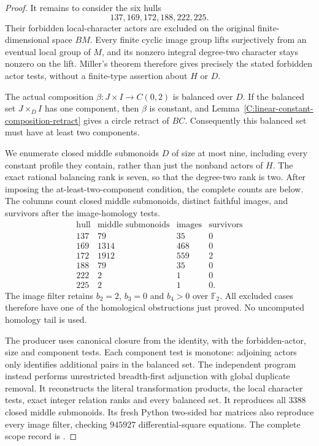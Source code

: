 \begin{proof}
It remains to consider the six hulls
\[
 137,169,172,188,222,225.
\]
Their forbidden local-character actors are excluded on the original
finite-dimensional space $BM$.  Every finite cyclic image group
lifts surjectively from an eventual local group of $M$, and its
nonzero integral degree-two character stays nonzero on the lift.
Miller's theorem therefore gives precisely the stated forbidden
actor tests, without a finite-type assertion about $H$ or $D$.

The actual composition $\beta:J\times I\to C(0,2)$ is balanced
over $D$.  If the balanced set $J\times_D I$ has one component,
then $\beta$ is constant, and
Lemma~\ref{C:linear-constant-composition-retract} gives a circle
retract of $BC$.  Consequently this balanced set must have at
least two components.

We enumerate closed middle submonoids $D$ of size at most nine,
including every constant profile they contain, rather than just
the nonband actors of $H$.  The exact rational balancing rank is
seven, so that the degree-two rank is two.  After imposing the
at-least-two-component condition, the complete counts are below.
The columns count closed middle submonoids, distinct faithful
images, and survivors after the image-homology tests.
\[
\begin{array}{c|r|r|r}
 \text{hull}&\text{middle submonoids}&
 \text{images}&\text{survivors}\\\hline
 137&79&35&0\\
 169&1314&468&0\\
 172&1912&559&2\\
 188&79&35&0\\
 222&2&1&0\\
 225&2&1&0.
\end{array}
\]
The image filter retains $b_2=2$, $b_3=0$ and $b_4>0$ over
$\mathbb F_2$.  All excluded cases therefore have one of the
homological obstructions just proved.  No uncomputed homology
tail is used.

The producer  uses
canonical closure from the identity, with the forbidden-actor,
size and component tests.  Each component test is monotone:
adjoining actors only identifies additional pairs in the balanced
set.  The independent program
 instead performs
unrestricted breadth-first adjunction with global duplicate removal.
It reconstructs the literal transformation products, the local
character tests, exact integer relation ranks and every balanced
set.  It reproduces all $3388$ closed middle submonoids.  Its fresh
Python two-sided bar matrices also reproduce every image filter,
checking $945927$ differential-square equations.  The complete
scope record is
.


\end{proof}
